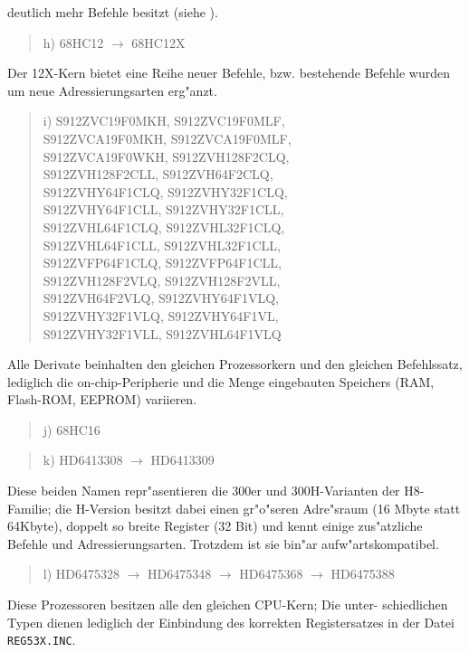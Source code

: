 \documentclass[12pt,a4paper,twoside]{report}
\newcommand{\tty}[1]{{\tt #1}}
\begin{document}
deutlich mehr Befehle besitzt (siehe \cite{Kaku}).
\begin{quote}
h) 68HC12 $\longrightarrow$ 68HC12X
\end{quote}
Der 12X-Kern bietet eine Reihe neuer Befehle, bzw. bestehende Befehle
wurden um neue Adressierungsarten erg"anzt.
\begin{quote}
i) S912ZVC19F0MKH, S912ZVC19F0MLF,\\
   S912ZVCA19F0MKH, S912ZVCA19F0MLF,\\
   S912ZVCA19F0WKH, S912ZVH128F2CLQ,\\
   S912ZVH128F2CLL, S912ZVH64F2CLQ,\\
   S912ZVHY64F1CLQ, S912ZVHY32F1CLQ,\\
   S912ZVHY64F1CLL, S912ZVHY32F1CLL,\\
   S912ZVHL64F1CLQ, S912ZVHL32F1CLQ,\\
   S912ZVHL64F1CLL, S912ZVHL32F1CLL,\\
   S912ZVFP64F1CLQ, S912ZVFP64F1CLL,\\
   S912ZVH128F2VLQ, S912ZVH128F2VLL,\\
   S912ZVH64F2VLQ, S912ZVHY64F1VLQ,\\
   S912ZVHY32F1VLQ, S912ZVHY64F1VL,\\
   S912ZVHY32F1VLL, S912ZVHL64F1VLQ 
\end{quote}
Alle Derivate beinhalten den gleichen Prozessorkern und den
gleichen Befehlssatz, lediglich die on-chip-Peripherie und
die Menge eingebauten Speichers (RAM, Flash-ROM, EEPROM)
variieren.
\begin{quote}
j) 68HC16
\end{quote}
\begin{quote}
k) HD6413308 $\longrightarrow$ HD6413309
\end{quote}
Diese beiden Namen repr"asentieren die 300er und 300H-Varianten der
H8-Familie; die H-Version besitzt dabei einen gr"o"seren Adre"sraum
(16 Mbyte statt 64Kbyte), doppelt so breite Register (32 Bit) und
kennt einige zus"atzliche Befehle und Adressierungsarten.  Trotzdem
ist sie bin"ar aufw"artskompatibel.
\begin{quote}
l) HD6475328 $\longrightarrow$ HD6475348 $\longrightarrow$
   HD6475368 $\longrightarrow$ HD6475388
\end{quote}
Diese Prozessoren besitzen alle den gleichen CPU-Kern; Die unter-
schiedlichen Typen dienen lediglich der Einbindung des korrekten
Registersatzes in der Datei \tty{REG53X.INC}.
\end{document}
